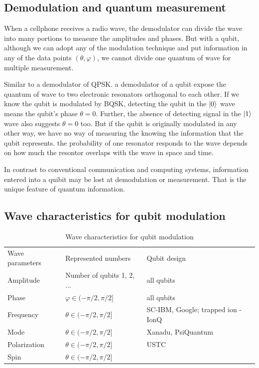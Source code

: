 \documentclass[Letter,11pt]{book}
\begin{document}
\subsection{Demodulation and quantum measurement}
When a cellphone receives a radio wave, the demodulator can divide the wave into many portions to measure the amplitudes and phases. But with a qubit, although we can adopt any of the modulation technique and put information in any of the data points $(\theta, \varphi)$, we cannot divide one quantum of wave for multiple measurement.

Similar to a demodulator of QPSK. a demodulator of a qubit expose the quantum of wave to two electronic resonators orthogonal to each other.  If we know the qubit is modulated by BQSK, detecting the qubit in the $\vert {0} \rangle_{}$ wave means the qubit's phase $\theta = 0$. Further, the absence of detecting signal in the $\vert {1} \rangle_{}$ wave also suggests $\theta = 0$ too. But if the qubit is originally modulated in any other way, we have no way of measuring the knowing the information that the qubit represents. the probability of one resonator responds to the wave depends on how much the resontor overlaps with the wave in space and time.

In contrast to conventional communication and computing systems, information entered into a quibit may be lost at demodulation or measurement. That is the unique feature of quantum information.

\subsection{Wave characteristics for qubit modulation}
\begin{table}[]
\caption{Wave characteristics for qubit modulation}
\label{modulation-characteristics}
\begin{tabular}{lll}
Wave parameters &Represented numbers &Qubit design   \\
Amplitude & Number of qubits 1, 2, ... & all qubits \\
Phase & $\varphi \in (-\pi /2, \pi /2] $& all qubits \\
Frequency & $\theta \in (-\pi /2, \pi /2]$ & SC-IBM, Google; trapped ion - IonQ \\
Mode & $\theta \in (-\pi /2, \pi /2]$ & Xanadu, PsiQuantum \\
Polarization & $\theta \in (-\pi /2, \pi /2]$ & USTC \\
Spin & $\theta \in (-\pi /2, \pi /2]$ & 
\end{tabular}
\end{table}
\end{document}
